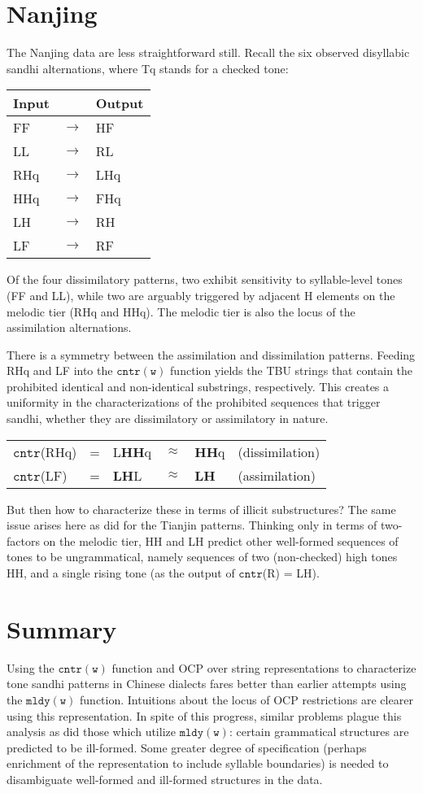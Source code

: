 \documentclass{article}
\newcommand{\C}{$\mathtt{cntr(w)}$ }
\begin{document}
\section{Nanjing}
The Nanjing data are less straightforward still. Recall the six observed disyllabic sandhi alternations, where Tq stands for a checked tone:
\begin{exe}
\ex
\begin{tabular}[t]{lcl}
 Input && Output \\
 \hline
FF & $\rightarrow$ & HF \\
LL & $\rightarrow$ & RL \\
RHq& $\rightarrow$ & LHq \\
HHq& $\rightarrow$ & FHq \\
LH & $\rightarrow$ & RH \\
LF & $\rightarrow$ & RF \\
\end{tabular}
\end{exe}
Of the four dissimilatory patterns, two exhibit sensitivity to syllable-level tones (FF and LL), while two are arguably triggered by adjacent H elements on the melodic tier (RHq and HHq). The melodic tier is also the locus of the assimilation alternations. \par
There is a symmetry between the assimilation and dissimilation patterns. Feeding RHq and LF into the \C function yields the TBU strings that contain the prohibited identical and non-identical substrings, respectively. This creates a uniformity in the characterizations of the prohibited sequences that trigger sandhi, whether they are dissimilatory or assimilatory in nature.
\begin{exe}
\ex
\begin{tabular}[t]{lcllll}
$\mathtt{cntr}$(RHq) & = & L\textbf{HH}q & $\approx$ & \textbf{HH}q & (dissimilation) \\
$\mathtt{cntr}$(LF) & = & \textbf{LH}L &  $\approx$ & \textbf{LH} & (assimilation) \\
\end{tabular}
\end{exe}
But then how to characterize these in terms of illicit substructures? The same issue arises here as did for the Tianjin patterns. Thinking only in terms of two-factors on the melodic tier, HH and LH predict other well-formed sequences of tones to be ungrammatical, namely sequences of two (non-checked) high tones HH, and a single rising tone (as the output of $\mathtt{cntr}$(R) = LH).
\section{Summary}
Using the \C function and OCP over string representations to characterize tone sandhi patterns in Chinese dialects fares better than earlier attempts using the $\mathtt{mldy(w)}$ function. Intuitions about the locus of OCP restrictions are clearer using this representation. In spite of this progress, similar problems plague this analysis as did those which utilize $\mathtt{mldy(w)}$: certain grammatical structures are predicted to be ill-formed. Some greater degree of specification (perhaps enrichment of the representation to include syllable boundaries) is needed to disambiguate well-formed and ill-formed structures in the data.
\end{document}
